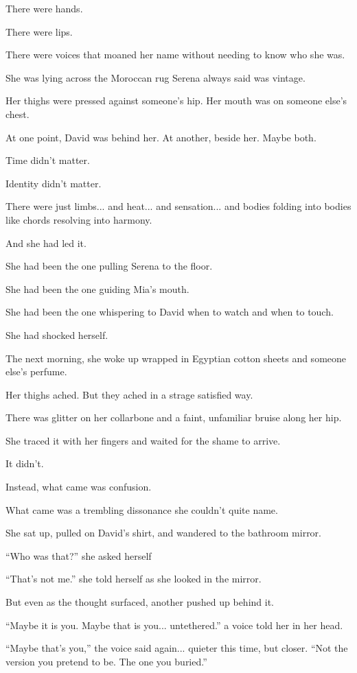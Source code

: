 There were hands. 

There were lips. 

There were voices that moaned her name without needing to know who she was.

She was lying across the Moroccan rug Serena always said was vintage. 

Her thighs were pressed against someone’s hip. 
Her mouth was on someone else’s chest. 

At one point, David was behind her. At another, beside her. Maybe 
both. 

Time didn’t matter. 

Identity didn’t matter. 

There were just limbs... and heat... and sensation... and bodies folding 
into bodies like chords resolving into harmony.

And she had led it.

She had been the one pulling Serena to the floor. 

She had been the one guiding Mia’s mouth.

She had been the one whispering to David when to watch and when to touch.

She had shocked herself.

The next morning, she woke up wrapped in Egyptian cotton sheets and someone else’s perfume. 

Her thighs ached. But they ached in a strage satisfied way. 

There was glitter on her collarbone and a faint, unfamiliar 
bruise along her hip. 

She traced it with her fingers and waited for the shame to arrive.

It didn’t.

Instead, what came was confusion. 

What came was a trembling dissonance she couldn’t quite name.

She sat up, pulled on David’s shirt, and wandered to the bathroom mirror.

``Who was that?'' she asked herself

``That’s not me.'' she told herself as she looked in the mirror.

But even as the thought surfaced, another pushed up behind it.

``Maybe it is you. Maybe that is you... untethered.'' a voice told her in her head.

``Maybe that’s you,'' the voice said again... quieter this time, but closer. 
``Not the version you pretend to be. The one you buried.''

